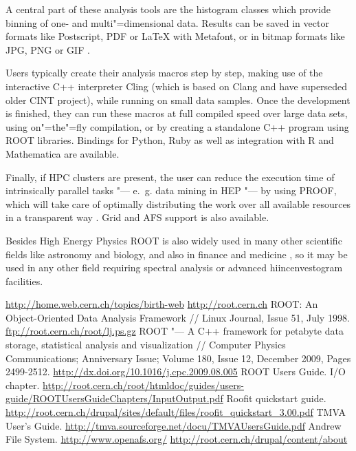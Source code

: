 \documentclass[10pt, a5paper]{article}
\begin{document}
A central part of these analysis tools are the histogram classes which provide binning of one- and multi"=dimensional data. Results can be saved in vector formats like Postscript, PDF or LaTeX with Metafont, or in bitmap formats like JPG, PNG or GIF \cite{Savchenko4}.

Users typically create their analysis macros step by step, making use of the interactive C++ interpreter Cling (which is based on Clang and have superseded older CINT project), while running on small data samples. Once the development is finished, they can run these macros at full compiled speed over large data sets, using on"=the"=fly compilation, or by creating a standalone C++ program using ROOT libraries. Bindings for Python, Ruby as well as integration with R and Mathematica are available.

Finally, if HPC clusters are present, the user can reduce the execution time of intrinsically parallel tasks "--- e.~g. data mining in HEP "--- by using PROOF, which will take care of optimally distributing the work over all available resources in a transparent way \cite{Savchenko4}. Grid and AFS \cite{Savchenko8} support is also available.

Besides High Energy Physics ROOT is also widely used in many other scientific fields like astronomy and biology, and also in finance and medicine \cite{Savchenko9}, so it may be used in any other field requiring spectral analysis or advanced hiincenvestogram facilities.

\begin{thebibliography}{9}
 \url{http://home.web.cern.ch/topics/birth-web}
 \url{http://root.cern.ch}
 ROOT: An Object-Oriented Data Analysis Framework // Linux Journal, Issue 51, July 1998. \url{ftp://root.cern.ch/root/lj.ps.gz}
 ROOT "--- A C++ framework for petabyte data storage, statistical analysis and visualization // Computer Physics Communications; Anniversary Issue; Volume 180, Issue 12, December 2009, Pages 2499-2512. \url{http://dx.doi.org/10.1016/j.cpc.2009.08.005} 
 ROOT Users Guide. I/O chapter. \url{http://root.cern.ch/root/htmldoc/guides/users-guide/ROOTUsersGuideChapters/InputOutput.pdf} 
 Roofit quickstart guide. \url{http://root.cern.ch/drupal/sites/default/files/roofit_quickstart_3.00.pdf} 
 TMVA User's Guide. \url{http://tmva.sourceforge.net/docu/TMVAUsersGuide.pdf}
 Andrew File System. \url{http://www.openafs.org/}
 \url{http://root.cern.ch/drupal/content/about}
\end{thebibliography}
\end{document}
